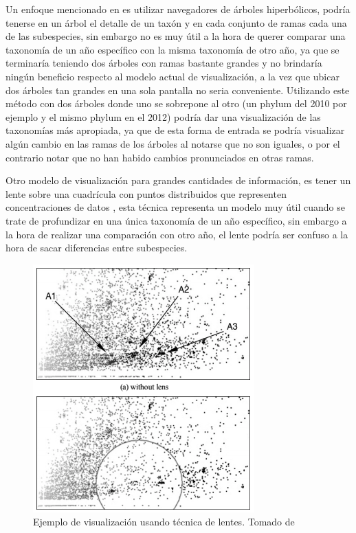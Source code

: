 \documentclass[journal]{IEEEtran}
\begin{document}
Un enfoque mencionado en \cite{visual-focus} es utilizar navegadores de árboles hiperbólicos, podría tenerse en un árbol el detalle de un taxón y en cada conjunto de ramas cada una de las subespecies, sin embargo no es muy útil a la hora de querer comparar una taxonomía de un año específico con la misma taxonomía de otro año, ya que se terminaría teniendo dos árboles con ramas bastante grandes y no brindaría ningún beneficio respecto al modelo actual de visualización, a la vez que ubicar dos árboles tan grandes en una sola pantalla no seria conveniente. Utilizando este método con dos árboles donde uno se sobrepone al otro (un phylum del 2010 por ejemplo y el mismo phylum en el 2012) podría dar una visualización de las taxonomías más apropiada, ya que de esta forma de entrada se podría visualizar algún cambio en las ramas de los árboles al notarse que no son iguales, o por el contrario notar que no han habido cambios pronunciados en otras ramas.

Otro modelo de visualización para grandes cantidades de información, es tener un lente sobre una cuadrícula con puntos distribuidos que representen concentraciones de datos \cite{lens-visual}, esta técnica representa un modelo muy útil cuando se trate de profundizar en una única taxonomía de un año específico, sin embargo a la hora de realizar una comparación con otro año, el lente podría ser confuso a la hora de sacar diferencias entre subespecies.
\begin{figure}[]
  \centering
  \includegraphics[scale=0.6]{plots-lens}
  \caption{Ejemplo de visualización usando técnica de lentes. Tomado  de \cite{lens-visual}}
\end{figure}
\end{document}
